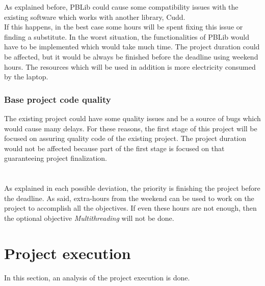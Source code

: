 As explained before, PBLib could cause some compatibility issues with the existing software which works with another library, Cudd. \\
If this happens, in the best case some hours will be spent fixing this issue or finding a substitute. In the worst situation, the functionalities of PBLib would have to be implemented which would take much time. The project duration could be affected, but it would be always be finished before the deadline using weekend hours. The resources which will be used in addition is more electricity consumed by the laptop.

\subsubsection{Base project code quality}
The existing project could have some quality issues and be a source of bugs which would cause many delays. For these reasons, the first stage of this project will be focused on assuring quality code of the existing project.  The project duration would not be affected because part of the first stage is focused on that guaranteeing project finalization.\\\\\\
As explained in each possible deviation, the priority is finishing the project before the deadline.  As said, extra-hours from the weekend can be used to work on the project to accomplish all the objectives. If even these hours are not enough, then the optional objective \emph{Multithreading} will not be done. 

\section{Project execution}%

In this section, an analysis of the project execution is done.

